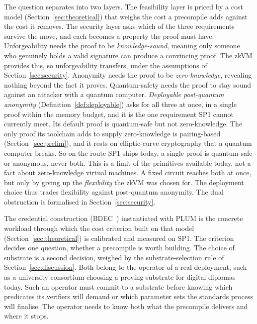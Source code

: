 The question separates into two layers. The feasibility layer is priced by a cost model (Section~\ref{sec:theoretical}) that weighs the cost a precompile adds against the cost it removes. The security layer asks which of the three requirements survive the move, and each becomes a property the proof must have. Unforgeability needs the proof to be \emph{knowledge-sound}, meaning only someone who genuinely holds a valid signature can produce a convincing proof. The zkVM provides this, so unforgeability transfers, under the assumptions of Section~\ref{sec:security}. Anonymity needs the proof to be \emph{zero-knowledge}, revealing nothing beyond the fact it proves. Quantum-safety needs the proof to stay sound against an attacker with a quantum computer. \emph{Deployable post-quantum anonymity} (Definition~\ref{def:deployable}) asks for all three at once, in a single proof within the memory budget, and it is the one requirement SP1 cannot currently meet. Its default proof is quantum-safe but not zero-knowledge. The only proof its toolchain adds to supply zero-knowledge is pairing-based (Section~\ref{sec:prelim}), and it rests on elliptic-curve cryptography that a quantum computer breaks. So on the route SP1 ships today, a single proof is quantum-safe or anonymous, never both. This is a limit of the primitives available today, not a fact about zero-knowledge virtual machines. A fixed circuit reaches both at once, but only by giving up the \emph{flexibility} the zkVM was chosen for. The deployment choice thus trades flexibility against post-quantum anonymity. The dual obstruction is formalised in Section~\ref{sec:security}.

The credential construction (BDEC~\cite{10.1007/978-981-96-0957-4_3}) instantiated with PLUM is the concrete workload through which the cost criterion built on that model (Section~\ref{sec:theoretical}) is calibrated and measured on SP1. The criterion decides one question, whether a precompile is worth building. The choice of substrate is a second decision, weighed by the substrate-selection rule of Section~\ref{sec:discussion}. Both belong to the operator of a real deployment, such as a university consortium choosing a proving substrate for digital diplomas today. Such an operator must commit to a substrate before knowing which predicates its verifiers will demand or which parameter sets the standards process will finalise. The operator needs to know both what the precompile delivers and where it stops.


